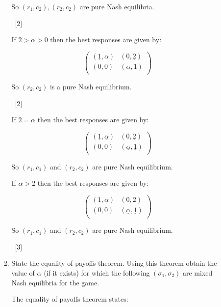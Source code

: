 \documentclass[12pt,a4paper]{article}
\begin{document}
\begin{enumerate}
\begin{enumerate}
\begin{enumerate}
                    So \((r_1, c_2), (r_2, c_2)\) are pure Nash equilibria.

            ~\hfill{[2]}

            If \(2>\alpha> 0\) then the best responses are given by:

                    \[\begin{pmatrix}
                        (\underline{1},\alpha) & (0,\underline{2})\\
                        (0,0) & (\underline{\alpha},\underline{1})\\
                    \end{pmatrix}\]

                So \((r_2, c_2)\) is a pure Nash equilibrium.

            ~\hfill{[2]}

                If \(2=\alpha\) then the best responses are given by:

                    \[\begin{pmatrix}
                            (\underline{1},\underline{\alpha}) &
                            (0,\underline{2})\\
                        (0,0) & (\underline{\alpha},\underline{1})\\
                    \end{pmatrix}\]

                So \((r_1, c_1)\) and \((r_2, c_2)\) are pure Nash equilibrium.

                If \(\alpha>2\) then the best responses are given by:

                    \[\begin{pmatrix}
                        (\underline{1},\underline{\alpha}) & (0,2)\\
                        (0,0) & (\underline{\alpha},\underline{1})\\
                    \end{pmatrix}\]

                So \((r_1, c_1)\) and \((r_2, c_2)\) are pure Nash equilibrium.

            ~\hfill{[3]}

            \item State the equality of payoffs theorem. Using this theorem
                obtain the value of \(\alpha\) (if it exists) for which the
                following \((\sigma_1, \sigma_2)\) are mixed Nash equilibria for the game.

            The equality of payoffs theorem states:


\end{enumerate}
\end{enumerate}
\end{enumerate}
\end{document}

